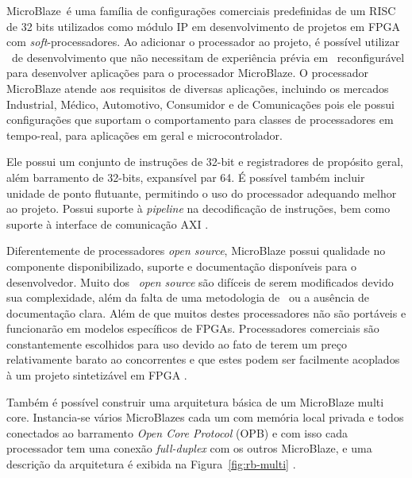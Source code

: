         
        
        
            MicroBlaze\texttrademark\ é uma família de configurações comerciais predefinidas de um RISC de 32 bits utilizados como módulo IP em desenvolvimento de projetos em FPGA com \textit{soft}-processadores. 
            Ao adicionar o processador ao projeto, é possível utilizar \softwares\ de desenvolvimento que não necessitam de experiência prévia em \hardware\ reconfigurável para desenvolver aplicações para o processador MicroBlaze. 
            O processador MicroBlaze atende aos requisitos de diversas aplicações, incluindo os mercados Industrial, Médico, Automotivo, Consumidor e de Comunicações pois ele possui configurações que suportam o comportamento para classes de processadores em tempo-real, para aplicações em geral e microcontrolador.
            
            Ele possui um conjunto de instruções de 32-bit e registradores de propósito geral, além barramento de 32-bits, expansível par 64.
            É possível também incluir unidade de ponto flutuante, permitindo o uso do processador adequando melhor ao projeto.
            Possui suporte à \textit{pipeline} na decodificação de instruções, bem como suporte à interface de comunicação AXI \citep{obeidat2011microblaze}.
            
            
            Diferentemente de processadores \textit{open source}, MicroBlaze possui qualidade no componente disponibilizado, suporte e documentação disponíveis para o desenvolvedor.
            Muito dos \designs\ \textit{open source} são difíceis de serem modificados devido sua complexidade, além da falta de uma metodologia de \design\ ou a ausência de documentação clara.
            Além de que muitos destes processadores não são portáveis e funcionarão em modelos específicos de FPGAs.
            Processadores comerciais são constantemente escolhidos para uso devido ao fato de terem um preço relativamente barato ao concorrentes e que estes podem ser facilmente acoplados à um projeto sintetizável em FPGA \citep{kranenburg2010mb, kranenburg2009reference, rosinger2004connecting}.
            
            Também é possível construir uma arquitetura básica de um MicroBlaze multi core.
            Instancia-se vários MicroBlazes cada um com memória local privada e todos conectados ao barramento \textit{Open Core Protocol} (OPB) e com isso cada processador tem uma conexão \textit{full-duplex} com os outros MicroBlaze, e uma descrição da arquitetura é exibida na Figura~\ref{fig:rb-multi}  \citep{xu2008multi}.
            
